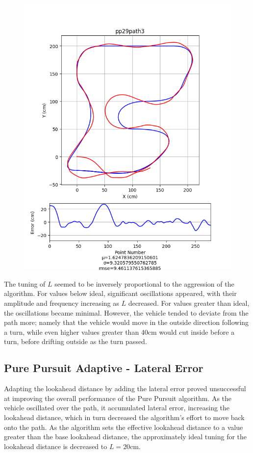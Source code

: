 \documentclass[mla7]{mla}
\begin{document}
\begin{paper}
\begin{figure}[H]
\endminipage\\
\includegraphics[width=\linewidth]{pathData/pppath3}
\endminipage
\end{figure}

The tuning of $L$ seemed to be inversely proportional to the aggression of the algorithm. For values below ideal, significant oscillations appeared, with their amplitude and frequency increasing as $L$ decreased. For values greater than ideal, the oscillations became minimal. However, the vehicle tended to deviate from the path more; namely that the vehicle would move in the outside direction following a turn, while even higher values greater than 40cm would cut inside before a turn, before drifting outside as the turn passed.

\subsection{Pure Pursuit Adaptive - Lateral Error}

Adapting the lookahead distance by adding the lateral error proved unsuccessful at improving the overall performance of the Pure Pursuit algorithm. As the vehicle oscillated over the path, it accumulated lateral error, increasing the lookahead distance, which in turn decreased the algorithm's effort to move back onto the path. As the algorithm sets the effective lookahead distance to a value greater than the base lookahead distance, the approximately ideal tuning for the lookahead distance is decreased to $L=20$cm.


\end{paper}
\end{document}
